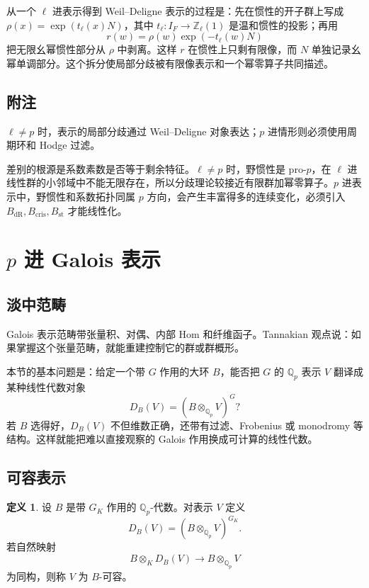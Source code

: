 \documentclass[11pt,a4paper,openany]{ctexbook}
\numberwithin{equation}{chapter}
\newcommand{\Q}{\mathbb{Q}}
\newcommand{\Z}{\mathbb{Z}}
\theoremstyle{plain}
\theoremstyle{definition}
\newtheorem{definition}[theorem]{定义}
\theoremstyle{remark}
\begin{document}
从一个 $\ell$ 进表示得到 Weil--Deligne 表示的过程是：先在惯性的开子群上写成 $\rho(x)=\exp(t_\ell(x)N)$，其中 $t_\ell:I_F\to\Z_\ell(1)$ 是温和惯性的投影；再用
\[
  r(w)=\rho(w)\exp(-t_\ell(w)N)
\]
把无限幺幂惯性部分从 $\rho$ 中剥离。这样 $r$ 在惯性上只剩有限像，而 $N$ 单独记录幺幂单调部分。这个拆分使局部分歧被有限像表示和一个幂零算子共同描述。

\subsection{附注}

$\ell\ne p$ 时，表示的局部分歧通过 Weil--Deligne 对象表达；$p$ 进情形则必须使用周期环和 Hodge 过滤。

差别的根源是系数素数是否等于剩余特征。$\ell\ne p$ 时，野惯性是 pro-$p$，在 $\ell$ 进线性群的小邻域中不能无限存在，所以分歧理论较接近有限群加幂零算子。$p$ 进表示中，野惯性和系数拓扑同属 $p$ 方向，会产生丰富得多的连续变化，必须引入 $B_{\mathrm{dR}},B_{\mathrm{cris}},B_{\mathrm{st}}$ 才能线性化。

\section{\texorpdfstring{$p$ 进 Galois 表示}{p 进 Galois 表示}}

\subsection{淡中范畴}

Galois 表示范畴带张量积、对偶、内部 Hom 和纤维函子。Tannakian 观点说：如果掌握这个张量范畴，就能重建控制它的群或群概形。

本节的基本问题是：给定一个带 $G$ 作用的大环 $B$，能否把 $G$ 的 $\Q_p$ 表示 $V$ 翻译成某种线性代数对象
\[
  D_B(V)=(B\otimes_{\Q_p}V)^G?
\]
若 $B$ 选得好，$D_B(V)$ 不但维数正确，还带有过滤、Frobenius 或 monodromy 等结构。这样就能把难以直接观察的 Galois 作用换成可计算的线性代数。

\subsection{可容表示}

\begin{definition}
设 $B$ 是带 $G_K$ 作用的 $\Q_p$-代数。对表示 $V$ 定义
\[
  D_B(V)=(B\otimes_{\Q_p}V)^{G_K}.
\]
若自然映射
\[
  B\otimes_KD_B(V)\to B\otimes_{\Q_p}V
\]
为同构，则称 $V$ 为 $B$-可容。
\end{definition}
\end{document}
